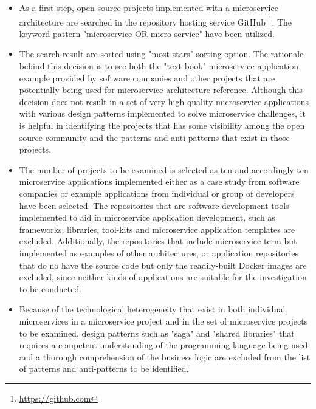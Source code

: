 \documentclass{Configuration_Files/PoliMi3i_thesis}
\begin{document}
\begin{itemize}
    \item As a first step, open source projects implemented with a microservice architecture are searched in the repository hosting service GitHub \footnote{\href{https://github.com}{https://github.com}}.
    The keyword pattern "microservice OR micro-service" have been utilized.

    \item The search result are sorted using "most stars" sorting option.
    The rationale behind this decision is to see both the "text-book" microservice application example provided by software companies and other projects that are potentially being used for microservice architecture reference.
    Although this decision does not result in a set of very high quality microservice applications with various design patterns implemented to solve microservice challenges, it is helpful in identifying the projects that has some visibility among the open source community and the patterns and anti-patterns that exist in those projects.
    
    \item The number of projects to be examined is selected as ten and accordingly ten microservice applications implemented either as a case study from software companies or example applications from individual or group of developers have been selected.
    The repositories that are software development tools implemented to aid in microservice application development, such as frameworks, libraries, tool-kits and microservice application templates are excluded.
    Additionally, the repositories that include microservice term but implemented as examples of other architectures, or application repositories that do no have the source code but only the readily-built Docker images are excluded, since neither kinds of applications are suitable for the investigation to be conducted.
    
    \item Because of the technological heterogeneity that exist in both individual microservices in a microservice project and in the set of microservice projects to be examined, design patterns such as "saga" and "shared libraries" that requires a competent understanding of the programming language being used and a thorough comprehension of the business logic are excluded from the list of patterns and anti-patterns to be identified.
    

\end{itemize}
\end{document}
